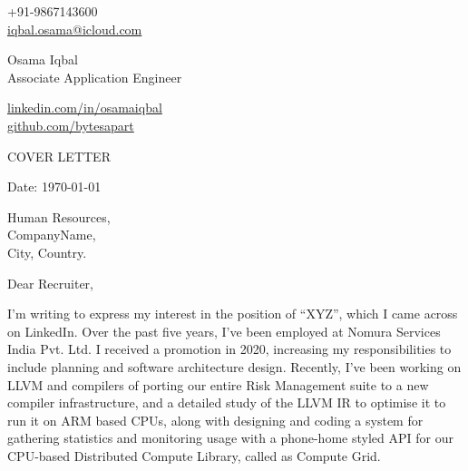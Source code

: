 \documentclass[11pt,a4paper]{article}
\begin{document}

\begin{center}
    \begin{minipage}[b]{0.24\textwidth}
            \large +91-9867143600 \\
            \large \href{mailto:iqbal.osama@icloud.com}{iqbal.osama@icloud.com} 
    \end{minipage}%
    \begin{minipage}[b]{0.5\textwidth}
            \centering
            {\Huge Osama Iqbal} \\ 
            \vspace{0.1cm}
            {\color{CarianBlue}\Large{Associate Application Engineer}}
    \end{minipage}%
    \begin{minipage}[b]{0.28\textwidth}
            \flushright \large
            {\href{https://www.linkedin.com/in/osamaiqbal/}{linkedin.com/in/osamaiqbal} } \\
            \href{https://github.com/bytesapart}{github.com/bytesapart}
    \end{minipage}   
    
\vspace{-0.15cm} 
{\color{CarianBlue} \hrulefill}
\end{center}

\justify
\setlength{\parindent}{0pt}
\setlength{\parskip}{12pt}
\vspace{0.2cm}
\begin{center}
    {\color{CarianBlue} \Large{COVER LETTER}}
\end{center}


Date: \today \par \vspace{-0.1cm}

Human Resources, \\
CompanyName, \\
City, Country.


Dear Recruiter,  %

I'm writing to express my interest in the position of “XYZ”, which I came across on LinkedIn. Over the past five years, I've been employed at Nomura Services India Pvt. Ltd. I received a promotion in 2020, increasing my responsibilities to include planning and software architecture design. Recently, I've been working on LLVM and compilers of porting our entire Risk Management suite to a new compiler infrastructure, and a detailed study of the LLVM IR to optimise it to run it on ARM based CPUs, along with designing and coding a system for gathering statistics and monitoring usage with a phone-home styled API for our CPU-based Distributed Compute Library, called as Compute Grid. \par
 
\end{document}
